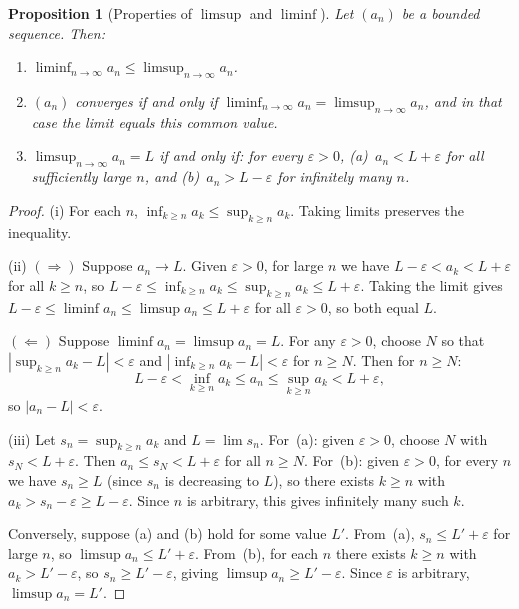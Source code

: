 \documentclass[11pt,a4paper]{article}
\theoremstyle{definition}
\theoremstyle{plain}
\newtheorem{proposition}[theorem]{Proposition}
\theoremstyle{remark}
\begin{document}
\begin{proposition}[Properties of $\limsup$ and $\liminf$]
\label{prop:limsup_props}
Let $(a_n)$ be a bounded sequence. Then:
\begin{enumerate}[nosep,label=(\roman*)]
    \item $\liminf_{n\to\infty} a_n \le \limsup_{n\to\infty} a_n$.
    \item $(a_n)$ converges if and only if
    $\liminf_{n\to\infty} a_n = \limsup_{n\to\infty} a_n$, and in that case
    the limit equals this common value.
    \item $\limsup_{n\to\infty} a_n = L$ if and only if: for every
    $\varepsilon > 0$, (a)~$a_n < L + \varepsilon$ for all sufficiently
    large $n$, and (b)~$a_n > L - \varepsilon$ for infinitely many $n$.
\end{enumerate}
\end{proposition}

\begin{proof}
(i) For each $n$, $\inf_{k \ge n} a_k \le \sup_{k \ge n} a_k$. Taking limits
preserves the inequality.

(ii) $(\Rightarrow)$ Suppose $a_n \to L$. Given $\varepsilon > 0$, for large $n$
we have $L - \varepsilon < a_k < L + \varepsilon$ for all $k \ge n$, so
$L - \varepsilon \le \inf_{k \ge n} a_k \le \sup_{k \ge n} a_k \le L + \varepsilon$.
Taking the limit gives $L - \varepsilon \le \liminf a_n \le \limsup a_n
\le L + \varepsilon$ for all $\varepsilon > 0$, so both equal $L$.

$(\Leftarrow)$ Suppose $\liminf a_n = \limsup a_n = L$. For any $\varepsilon > 0$,
choose $N$ so that $|\sup_{k \ge n} a_k - L| < \varepsilon$ and
$|\inf_{k \ge n} a_k - L| < \varepsilon$ for $n \ge N$. Then for $n \ge N$:
\[
L - \varepsilon < \inf_{k \ge n} a_k \le a_n \le \sup_{k \ge n} a_k < L + \varepsilon,
\]
so $|a_n - L| < \varepsilon$.

(iii) Let $s_n = \sup_{k \ge n} a_k$ and $L = \lim s_n$. For~(a): given
$\varepsilon > 0$, choose $N$ with $s_N < L + \varepsilon$. Then $a_n \le s_N <
L + \varepsilon$ for all $n \ge N$. For~(b): given $\varepsilon > 0$, for every $n$
we have $s_n \ge L$ (since $s_n$ is decreasing to $L$), so there exists $k \ge n$
with $a_k > s_n - \varepsilon \ge L - \varepsilon$. Since $n$ is arbitrary, this
gives infinitely many such $k$.

Conversely, suppose (a) and (b) hold for some value $L'$. From~(a), $s_n \le
L' + \varepsilon$ for large $n$, so $\limsup a_n \le L' + \varepsilon$.
From~(b), for each $n$ there exists $k \ge n$ with $a_k > L' - \varepsilon$,
so $s_n \ge L' - \varepsilon$, giving $\limsup a_n \ge L' - \varepsilon$.
Since $\varepsilon$ is arbitrary, $\limsup a_n = L'$.
\end{proof}
\end{document}
